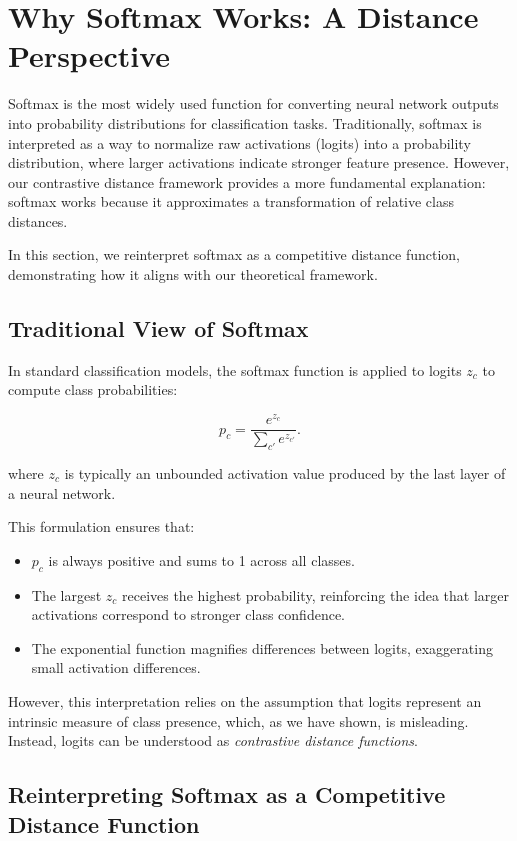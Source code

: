 \section{Why Softmax Works: A Distance Perspective}

Softmax is the most widely used function for converting neural network outputs into probability distributions for classification tasks. Traditionally, softmax is interpreted as a way to normalize raw activations (logits) into a probability distribution, where larger activations indicate stronger feature presence. However, our contrastive distance framework provides a more fundamental explanation: softmax works because it approximates a transformation of relative class distances.

In this section, we reinterpret softmax as a competitive distance function, demonstrating how it aligns with our theoretical framework.

\subsection{Traditional View of Softmax}

In standard classification models, the softmax function is applied to logits \( z_c \) to compute class probabilities:

\[
p_c = \frac{e^{z_c}}{\sum_{c'} e^{z_{c'}}}.
\]

where \( z_c \) is typically an unbounded activation value produced by the last layer of a neural network.

This formulation ensures that:

\begin{itemize}
    \item \( p_c \) is always positive and sums to 1 across all classes.
    \item The largest \( z_c \) receives the highest probability, reinforcing the idea that larger activations correspond to stronger class confidence.
    \item The exponential function magnifies differences between logits, exaggerating small activation differences.
\end{itemize}

However, this interpretation relies on the assumption that logits represent an intrinsic measure of class presence, which, as we have shown, is misleading. Instead, logits can be understood as \textit{contrastive distance functions}.

\subsection{Reinterpreting Softmax as a Competitive Distance Function}

